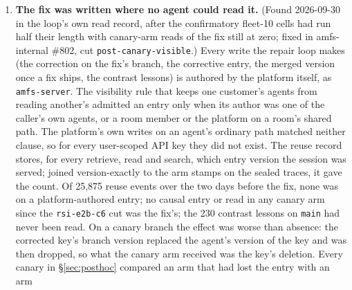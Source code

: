 \documentclass[11pt]{article}
\newcommand{\code}[1]{\texttt{#1}}
\begin{document}
\begin{enumerate}[leftmargin=1.6em, itemsep=0.35em]
the fix's. The agent declares its situation per run in its own words, often carrying the very
condition the change turns on (``pip audit requests pin with legacy sdk''); situation identity
folded one agent's 56 declarations to 10 canonicals, and the fixes carried others. So 0--8 of
16--30 exposed runs per arm were graded, and no canary decided in 200 episodes with ten agents.
The one whose declarations were stable reached 25/30 graded, found 12\,\% against 17\,\%
recurrence, and timed out, because the rule waited for a significant improvement. Corrected
after approval (amendment~(v), cut \code{post-canary-ni}): the canary grades runs in the fix's
situation or that read an entry the fix is about, and its primary is non-inferiority, because
the canary is the harm gate on a change the replay tiers already proved. Canonical merging was
not done; it changes situation identity for every customer with the opposite failure mode.
Re-measured (\S\ref{sec:posthoc}): graded runs rose from 0--27\,\% of exposure to 12--55\,\%,
four of nine canaries reached the floor, none decided.
\item \textbf{The fix was written where no agent could read it.} (Found 2026-09-30 in the
loop's own read record, after the confirmatory fleet-10 cells had run half their length with
canary-arm reads of the fix still at zero; fixed in amfs-internal \#802, cut
\code{post-canary-visible}.) Every write the repair loop makes (the correction on the fix's
branch, the corrective entry, the merged version once a fix ships, the contrast lessons) is
authored by the platform itself, as \code{amfs-server}. The visibility rule that keeps one
customer's agents from reading another's admitted an entry only when its author was one of the
caller's own agents, or a room member or the platform on a room's shared path. The platform's own
writes on an agent's ordinary path matched neither clause, so for every user-scoped API key they
did not exist. The reuse record stores, for every retrieve, read and search, which entry version
the session was served; joined version-exactly to the arm stamps on the sealed traces, it gave
the count. Of 25,875 reuse events over the two days before the fix, none was on a
platform-authored entry; no causal entry or read in any canary arm since the \code{rsi-e2b-c6}
cut was the fix's; the 230 contrast lessons on \code{main} had never been read. On a canary
branch the effect was worse than absence: the corrected key's branch version replaced the
agent's version of the key and was then dropped, so what the canary arm received was the key's
deletion. Every canary in \S\ref{sec:posthoc} compared an arm that had lost the entry with an arm

\end{enumerate}
\end{document}
